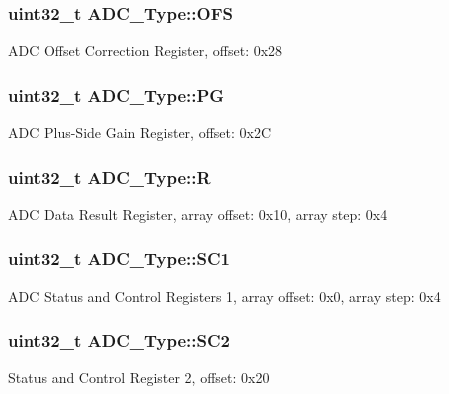 \subsubsection[{\texorpdfstring{O\+FS}{OFS}}]{ uint32\+\_\+t A\+D\+C\+\_\+\+Type\+::\+O\+FS}\hypertarget{structADC__Type_a1081f8facbb93133c09e83ef18b90b10}{}\label{structADC__Type_a1081f8facbb93133c09e83ef18b90b10}
A\+DC Offset Correction Register, offset\+: 0x28 
\subsubsection[{\texorpdfstring{PG}{PG}}]{ uint32\+\_\+t A\+D\+C\+\_\+\+Type\+::\+PG}\hypertarget{structADC__Type_a3c2b3bd7317c8347410247700bff991f}{}\label{structADC__Type_a3c2b3bd7317c8347410247700bff991f}
A\+DC Plus-\/\+Side Gain Register, offset\+: 0x2C 
\subsubsection[{\texorpdfstring{R}{R}}]{ uint32\+\_\+t A\+D\+C\+\_\+\+Type\+::R}\hypertarget{structADC__Type_af7aa0f906f46c2a00a0f1160f738e935}{}\label{structADC__Type_af7aa0f906f46c2a00a0f1160f738e935}
A\+DC Data Result Register, array offset\+: 0x10, array step\+: 0x4 
\subsubsection[{\texorpdfstring{S\+C1}{SC1}}]{ uint32\+\_\+t A\+D\+C\+\_\+\+Type\+::\+S\+C1}\hypertarget{structADC__Type_a093e1feaef0edc25a2a6740947bc760c}{}\label{structADC__Type_a093e1feaef0edc25a2a6740947bc760c}
A\+DC Status and Control Registers 1, array offset\+: 0x0, array step\+: 0x4 
\subsubsection[{\texorpdfstring{S\+C2}{SC2}}]{ uint32\+\_\+t A\+D\+C\+\_\+\+Type\+::\+S\+C2}\hypertarget{structADC__Type_a7397e1ccace879809b64c8b689a13418}{}\label{structADC__Type_a7397e1ccace879809b64c8b689a13418}
Status and Control Register 2, offset\+: 0x20 

